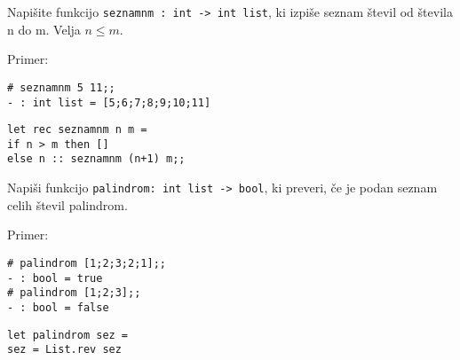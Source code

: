 \begin{ex}
Napi\v site funkcijo \lstinline{seznamnm : int -> int list}, ki izpi\v se seznam \v stevil od \v stevila n do m. Velja $n\le m$.

Primer: \begin{lstlisting}
# seznamnm 5 11;;
- : int list = [5;6;7;8;9;10;11] 
\end{lstlisting}

\begin{sol}
\begin{lstlisting}
let rec seznamnm n m =
if n > m then []
else n :: seznamnm (n+1) m;;
\end{lstlisting}
\end{sol}



\end{ex}
\begin{ex}
Napi\v si funkcijo \lstinline{palindrom: int list -> bool}, ki preveri, \v ce je podan seznam celih \v stevil palindrom.

Primer: \begin{lstlisting}
# palindrom [1;2;3;2;1];;
- : bool = true
# palindrom [1;2;3];;
- : bool = false
\end{lstlisting}

\begin{sol}
\begin{lstlisting}
let palindrom sez =
sez = List.rev sez
\end{lstlisting}
\end{sol}

\end{ex}




